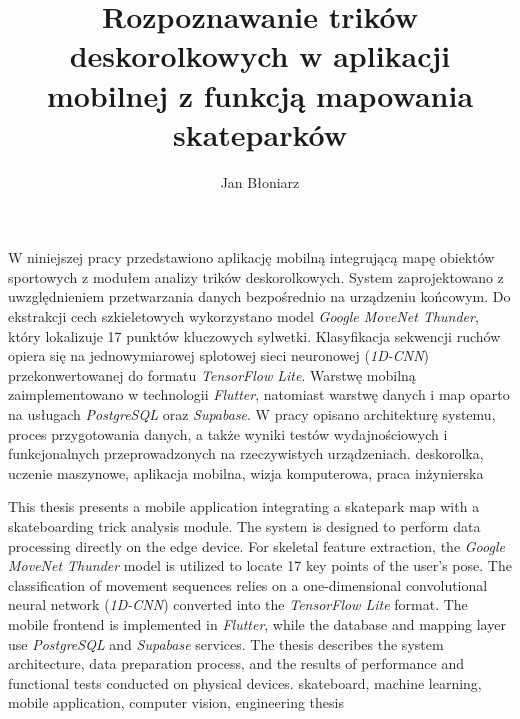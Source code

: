 \documentclass[
    left=2.5cm,         %
    right=2.5cm,        %
    top=2.5cm,          %
    bottom=3cm,         %
    bindingoffset=6mm,  %
    nohyphenation=false %
]{eiti/eiti-thesis}
\begin{document}
\EngineerThesis%
{}
\title{
    Rozpoznawanie trików deskorolkowych w aplikacji mobilnej z funkcją mapowania skateparków
}
\author{Jan Błoniarz}
\date{\the\year}
\maketitle

\cleardoublepage %
\streszczenie W niniejszej pracy przedstawiono aplikację mobilną integrującą mapę obiektów sportowych z modułem analizy trików deskorolkowych. System zaprojektowano z uwzględnieniem przetwarzania danych bezpośrednio na urządzeniu końcowym. Do ekstrakcji cech szkieletowych wykorzystano model \textit{Google MoveNet Thunder}, który lokalizuje 17 punktów kluczowych sylwetki. Klasyfikacja sekwencji ruchów opiera się na jednowymiarowej splotowej sieci neuronowej (\textit{1D-CNN}) przekonwertowanej do formatu \textit{TensorFlow Lite}. Warstwę mobilną zaimplementowano w technologii \textit{Flutter}, natomiast warstwę danych i map oparto na usługach \textit{PostgreSQL} oraz \textit{Supabase}. W pracy opisano architekturę systemu, proces przygotowania danych, a także wyniki testów wydajnościowych i funkcjonalnych przeprowadzonych na rzeczywistych urządzeniach.
\slowakluczowe deskorolka, uczenie maszynowe, aplikacja mobilna, wizja komputerowa, praca inżynierska

\newpage
\abstract This thesis presents a mobile application integrating a skatepark map with a skateboarding trick analysis module. The system is designed to perform data processing directly on the edge device. For skeletal feature extraction, the \textit{Google MoveNet Thunder} model is utilized to locate 17 key points of the user's pose. The classification of movement sequences relies on a one-dimensional convolutional neural network (\textit{1D-CNN}) converted into the \textit{TensorFlow Lite} format. The mobile frontend is implemented in \textit{Flutter}, while the database and mapping layer use \textit{PostgreSQL} and \textit{Supabase} services. The thesis describes the system architecture, data preparation process, and the results of performance and functional tests conducted on physical devices.
\keywords skateboard, machine learning, mobile application, computer vision, engineering thesis
\end{document}
